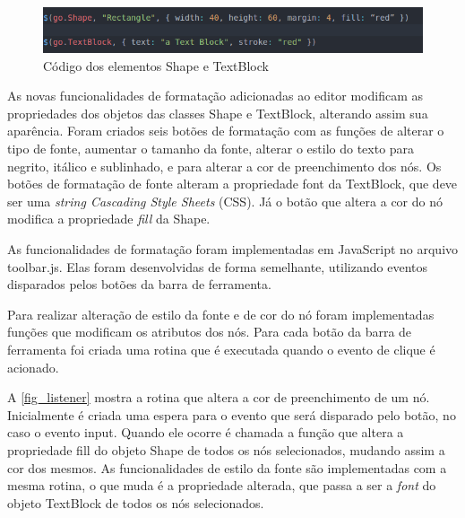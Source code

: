 \documentclass[
	12pt,				%
	openright,			%
	oneside,			%
	a4paper,			%
	english,			%
	french,				%
	spanish,			%
	brazil				%
	]{abntex2}
\begin{document}
\begin{figure}[htb]
	\caption{\label{fig_gojselements} Código dos elementos Shape e TextBlock}
	\begin{center}
		\includegraphics[scale=0.6]{gojselements.png}
	\end{center}
\end{figure}

As novas funcionalidades de formatação adicionadas ao editor modificam as propriedades dos objetos das classes Shape e TextBlock, alterando assim sua aparência. Foram criados seis botões de formatação com as funções de alterar o tipo de fonte, aumentar o tamanho da fonte, alterar o estilo do texto para negrito, itálico e sublinhado, e para alterar a cor de preenchimento dos nós. Os botões de formatação de fonte alteram a propriedade font da TextBlock, que deve ser uma \textit{string Cascading Style Sheets} (CSS). Já o botão que altera a cor do nó modifica a propriedade \textit{fill} da Shape.

As funcionalidades de formatação foram implementadas em JavaScript no arquivo toolbar.js. Elas foram desenvolvidas de forma semelhante, utilizando eventos disparados pelos botões da barra de ferramenta.

Para realizar alteração de estilo da fonte e de cor do nó foram implementadas funções que modificam os atributos dos nós. Para cada botão da barra de ferramenta foi criada uma rotina que é executada quando o evento de clique é acionado.

A \autoref{fig_listener} mostra a rotina que altera a cor de preenchimento de um nó. Inicialmente é criada uma espera para o evento que será disparado pelo botão, no caso o evento input. Quando ele ocorre é chamada a função que altera a propriedade fill do objeto Shape de todos os nós selecionados, mudando assim a cor dos mesmos. As funcionalidades de estilo da fonte são implementadas com a mesma rotina, o que muda é a propriedade alterada, que passa a ser a \textit{font} do objeto TextBlock de todos os nós selecionados.    
\end{document}
